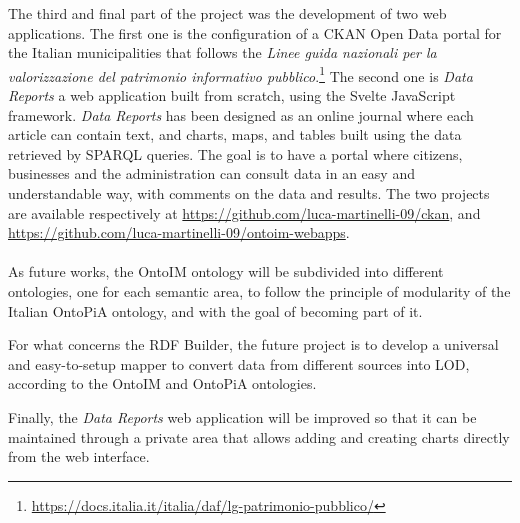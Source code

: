 The third and final part of the project was the development of two web applications. The first one is the configuration of a CKAN Open Data portal for the Italian municipalities that follows the \textit{Linee guida nazionali per la valorizzazione del patrimonio informativo pubblico}.\footnote{\url{https://docs.italia.it/italia/daf/lg-patrimonio-pubblico/}} The second one is \textit{Data Reports} a web application built from scratch, using the Svelte JavaScript framework. \textit{Data Reports} has been designed as an online journal where each article can contain text, and charts, maps, and tables built using the data retrieved by \ac{SPARQL} queries. The goal is to have a portal where citizens, businesses and the administration can consult data in an easy and understandable way, with comments on the data and results. The two projects are available respectively at \url{https://github.com/luca-martinelli-09/ckan}, and \url{https://github.com/luca-martinelli-09/ontoim-webapps}.

\paragraph*{}

As future works, the \ac{OntoIM} ontology will be subdivided into different ontologies, one for each semantic area, to follow the principle of modularity of the Italian OntoPiA ontology, and with the goal of becoming part of it.

For what concerns the \ac{RDF} Builder, the future project is to develop a universal and easy-to-setup mapper to convert data from different sources into \ac{LOD}, according to the \ac{OntoIM} and OntoPiA ontologies.

Finally, the \textit{Data Reports} web application will be improved so that it can be maintained through a private area that allows adding and creating charts directly from the web interface.